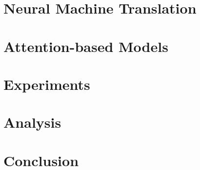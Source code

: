

\section{Neural Machine Translation}
\label{sec:nmt}


\section{Attention-based Models}
\label{sec:attn}



\section{Experiments}
\label{sec:exp}



\section{Analysis}
\label{sec:analysis}


\section{Conclusion}
\label{sec:conclude}



